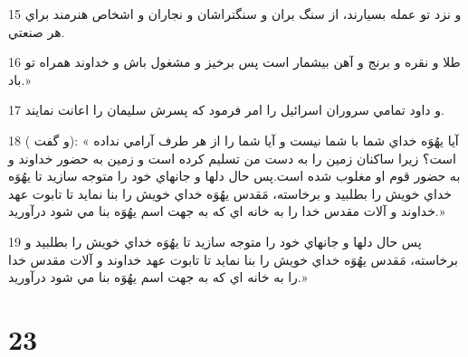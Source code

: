 \par 15 و نزد تو عمله بسيارند، از سنگ بران و سنگتراشان و نجاران و اشخاص هنرمند براي هر صنعتي.
\par 16 طلا و نقره و برنج و آهن بيشمار است پس برخيز و مشغول باش و خداوند همراه تو باد.»
\par 17 و داود تمامي سروران اسرائيل را امر فرمود که پسرش سليمان را اعانت نمايند.
\par 18 ( و گفت): « آيا يهُوَه خداي شما با شما نيست و آيا شما را از هر طرف آرامي نداده است؟ زيرا ساکنان زمين را به دست من تسليم کرده است و زمين به حضور خداوند و به حضور قوم او مغلوب شده است.پس حال دلها و جانهاي خود را متوجه سازيد تا يهُوَه خداي خويش را بطلبيد و برخاسته، مَقدس يهُوَه خداي خويش را بنا نمايد تا تابوت عهد خداوند و آلات مقدس خدا را به خانه اي که به جهت اسم يهُوَه بنا مي شود درآوريد.»
\par 19 پس حال دلها و جانهاي خود را متوجه سازيد تا يهُوَه خداي خويش را بطلبيد و برخاسته، مَقدس يهُوَه خداي خويش را بنا نمايد تا تابوت عهد خداوند و آلات مقدس خدا را به خانه اي که به جهت اسم يهُوَه بنا مي شود درآوريد.»
 
\chapter{23}


